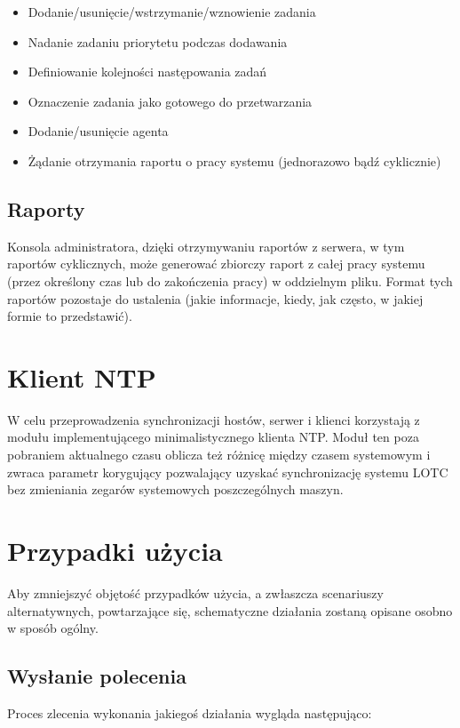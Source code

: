 \documentclass[10pt,a4paper]{article}
\begin{document}
			\begin{itemize}   
				\item Dodanie/usunięcie/wstrzymanie/wznowienie zadania
				\item Nadanie zadaniu priorytetu podczas dodawania
				\item Definiowanie kolejności następowania zadań
				\item Oznaczenie zadania jako gotowego do przetwarzania
				\item Dodanie/usunięcie agenta
				\item Żądanie otrzymania raportu o pracy systemu (jednorazowo bądź cyklicznie)
			\end{itemize}
		
		\subsection{Raporty}
			Konsola administratora, dzięki otrzymywaniu raportów z serwera, w tym raportów cyklicznych, może generować zbiorczy raport z całej pracy systemu (przez określony czas lub do zakończenia pracy) w oddzielnym pliku. Format tych raportów pozostaje do ustalenia (jakie informacje, kiedy, jak często, w jakiej formie to przedstawić).
    
    \section{Klient NTP}
    
        W celu przeprowadzenia synchronizacji hostów, serwer i klienci korzystają z modułu implementującego minimalistycznego klienta NTP. Moduł ten poza pobraniem aktualnego czasu oblicza też różnicę między czasem systemowym i zwraca parametr korygujący pozwalający uzyskać synchronizację systemu LOTC bez zmieniania zegarów systemowych poszczególnych maszyn. 
    
    \section{Przypadki użycia}
        Aby zmniejszyć objętość przypadków użycia, a zwłaszcza scenariuszy alternatywnych, powtarzające się, schematyczne działania zostaną opisane osobno w sposób ogólny.                    
        
        \subsection{Wysłanie polecenia}
            Proces zlecenia wykonania jakiegoś działania wygląda następująco:
            
\end{document}
